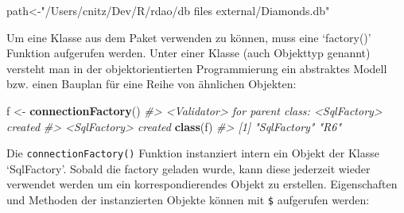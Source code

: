 \documentclass[]{article}
\newenvironment{Shaded}{\begin{snugshade}}{\end{snugshade}}
\newcommand{\CommentTok}[1]{\textcolor[rgb]{0.56,0.35,0.01}{\textit{#1}}}
\newcommand{\DataTypeTok}[1]{\textcolor[rgb]{0.13,0.29,0.53}{#1}}
\newcommand{\DecValTok}[1]{\textcolor[rgb]{0.00,0.00,0.81}{#1}}
\newcommand{\KeywordTok}[1]{\textcolor[rgb]{0.13,0.29,0.53}{\textbf{#1}}}
\newcommand{\NormalTok}[1]{#1}
\newcommand{\OperatorTok}[1]{\textcolor[rgb]{0.81,0.36,0.00}{\textbf{#1}}}
\newcommand{\StringTok}[1]{\textcolor[rgb]{0.31,0.60,0.02}{#1}}
\begin{document}
\begin{Shaded}
\begin{Highlighting}[]
\NormalTok{path<-}\StringTok{"/Users/cnitz/Dev/R/rdao/db files external/Diamonds.db"}
\end{Highlighting}
\end{Shaded}

Um eine Klasse aus dem Paket verwenden zu können, muss eine `factory()'
Funktion aufgerufen werden. Unter einer Klasse (auch Objekttyp genannt)
versteht man in der objektorientierten Programmierung ein abstraktes
Modell bzw. einen Bauplan für eine Reihe von ähnlichen Objekten:

\begin{Shaded}
\begin{Highlighting}[]
\NormalTok{f <-}\StringTok{ }\KeywordTok{connectionFactory}\NormalTok{()}
\CommentTok{#> <Validator> for parent class: <SqlFactory> created}
\CommentTok{#> <SqlFactory> created}
\KeywordTok{class}\NormalTok{(f)}
\CommentTok{#> [1] "SqlFactory" "R6"}
\end{Highlighting}
\end{Shaded}

Die \texttt{connectionFactory()} Funktion instanziert intern ein Objekt
der Klasse `SqlFactory'. Sobald die factory geladen wurde, kann diese
jederzeit wieder verwendet werden um ein korrespondierendes Objekt zu
erstellen. Eigenschaften und Methoden der instanzierten Objekte können
mit \texttt{\$} aufgerufen werden:

\begin{Shaded}
\end{Shaded}
\end{document}
